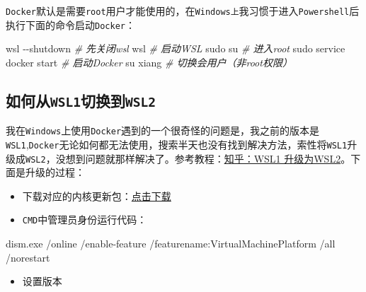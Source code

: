 \documentclass[
  10pt,
]{book}
\newenvironment{Shaded}{\begin{snugshade}}{\end{snugshade}}
\newcommand{\CommentTok}[1]{\textcolor[rgb]{0.56,0.35,0.01}{\textit{#1}}}
\newcommand{\NormalTok}[1]{#1}
\newcommand{\SpecialCharTok}[1]{\textcolor[rgb]{0.00,0.00,0.00}{#1}}
\providecommand{\tightlist}{%
  \setlength{\itemsep}{0pt}\setlength{\parskip}{0pt}}
\begin{document}
\texttt{Docker}默认是需要\texttt{root}用户才能使用的，在\texttt{Windows上}我习惯于进入\texttt{Powershell}后执行下面的命令启动\texttt{Docker}：

\begin{Shaded}
\begin{Highlighting}[]
\NormalTok{wsl }\SpecialCharTok{{-}{-}}\NormalTok{shutdown }\CommentTok{\# 先关闭wsl}
\NormalTok{wsl }\CommentTok{\# 启动WSL}
\NormalTok{sudo su }\CommentTok{\# 进入root}
\NormalTok{sudo service docker start }\CommentTok{\# 启动Docker}
\NormalTok{su xiang }\CommentTok{\# 切换会用户（非root权限）}
\end{Highlighting}
\end{Shaded}

\hypertarget{ux5982ux4f55ux4ecewsl1ux5207ux6362ux5230wsl2}{%
\subsection{\texorpdfstring{如何从\texttt{WSL1}切换到\texttt{WSL2}}{如何从WSL1切换到WSL2}}\label{ux5982ux4f55ux4ecewsl1ux5207ux6362ux5230wsl2}}

我在\texttt{Windows}上使用\texttt{Docker}遇到的一个很奇怪的问题是，我之前的版本是\texttt{WSL1},\texttt{Docker}无论如何都无法使用，搜索半天也没有找到解决方法，索性将\texttt{WSL1}升级成\texttt{WSL2}，没想到问题就那样解决了。参考教程：\href{https://zhuanlan.zhihu.com/p/356397851}{知乎：WSL1 升级为WSL2}。下面是升级的过程：

\begin{itemize}
\item
  下载对应的内核更新包：\href{https://link.zhihu.com/?target=https\%3A//wslstorestorage.blob.core.windows.net/wslblob/wsl_update_x64.msi}{点击下载}
\item
  \texttt{CMD}中管理员身份运行代码：
\end{itemize}

\begin{Shaded}
\begin{Highlighting}[]
\NormalTok{dism.exe }\SpecialCharTok{/}\NormalTok{online }\SpecialCharTok{/}\NormalTok{enable}\SpecialCharTok{{-}}\NormalTok{feature }\SpecialCharTok{/}\NormalTok{featurename}\SpecialCharTok{:}\NormalTok{VirtualMachinePlatform }\SpecialCharTok{/}\NormalTok{all }\SpecialCharTok{/}\NormalTok{norestart}
\end{Highlighting}
\end{Shaded}

\begin{itemize}
\tightlist
\item
  设置版本
\end{itemize}
\end{document}
